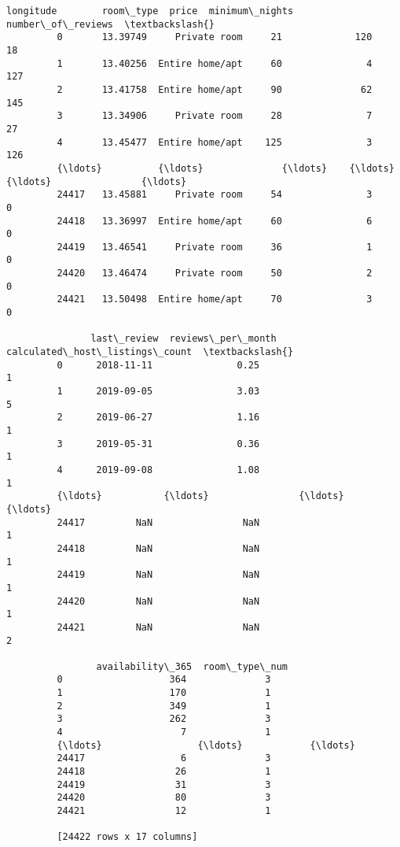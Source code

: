 \documentclass[11pt]{article}
\begin{document}
\begin{Verbatim}[commandchars=\\\{\}]
                longitude        room\_type  price  minimum\_nights  number\_of\_reviews  \textbackslash{}
         0       13.39749     Private room     21             120                 18   
         1       13.40256  Entire home/apt     60               4                127   
         2       13.41758  Entire home/apt     90              62                145   
         3       13.34906     Private room     28               7                 27   
         4       13.45477  Entire home/apt    125               3                126   
         {\ldots}          {\ldots}              {\ldots}    {\ldots}             {\ldots}                {\ldots}   
         24417   13.45881     Private room     54               3                  0   
         24418   13.36997  Entire home/apt     60               6                  0   
         24419   13.46541     Private room     36               1                  0   
         24420   13.46474     Private room     50               2                  0   
         24421   13.50498  Entire home/apt     70               3                  0   
         
               last\_review  reviews\_per\_month  calculated\_host\_listings\_count  \textbackslash{}
         0      2018-11-11               0.25                               1   
         1      2019-09-05               3.03                               5   
         2      2019-06-27               1.16                               1   
         3      2019-05-31               0.36                               1   
         4      2019-09-08               1.08                               1   
         {\ldots}           {\ldots}                {\ldots}                             {\ldots}   
         24417         NaN                NaN                               1   
         24418         NaN                NaN                               1   
         24419         NaN                NaN                               1   
         24420         NaN                NaN                               1   
         24421         NaN                NaN                               2   
         
                availability\_365  room\_type\_num  
         0                   364              3  
         1                   170              1  
         2                   349              1  
         3                   262              3  
         4                     7              1  
         {\ldots}                 {\ldots}            {\ldots}  
         24417                 6              3  
         24418                26              1  
         24419                31              3  
         24420                80              3  
         24421                12              1  
         
         [24422 rows x 17 columns]
\end{Verbatim}
            
\end{document}

